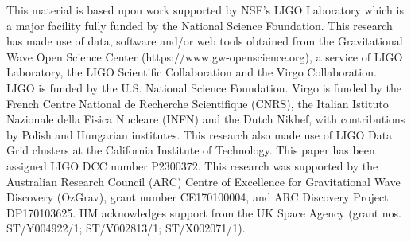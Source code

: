 \documentclass[pra,superscriptaddress,reprint,amsmath,amssymb,nofootinbib]{revtex4-2}
\begin{document}
\begin{acknowledgements}
This material is based upon work supported by NSF's LIGO Laboratory which is a major facility fully funded by the National Science Foundation. This research has made use of data, software and/or web tools obtained from the Gravitational Wave Open Science Center (https://www.gw-openscience.org), a service of LIGO Laboratory, the LIGO Scientific Collaboration and the Virgo Collaboration. LIGO is funded by the U.S. National Science Foundation. Virgo is funded by the French Centre National de Recherche Scientifique (CNRS), the Italian Istituto Nazionale della Fisica Nucleare (INFN) and the Dutch Nikhef, with contributions by Polish and Hungarian institutes. This research also
made use of LIGO Data Grid clusters at the California Institute of Technology. This paper has been
assigned LIGO DCC number P2300372. This research was supported by
the Australian Research Council (ARC) Centre of Excellence for Gravitational Wave Discovery (OzGrav), grant number CE170100004, and ARC Discovery Project DP170103625. HM acknowledges support from the UK Space Agency (grant
nos. ST/Y004922/1; ST/V002813/1; ST/X002071/1). 
\end{acknowledgements}
\end{document}
